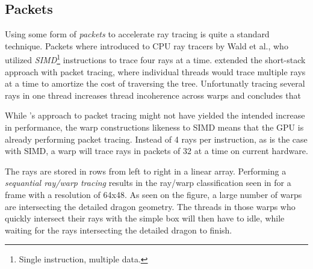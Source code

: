 \subsection{Packets}


Using some form of \textit{packets} to accelerate ray tracing is quite
a standard technique. Packets where introduced to CPU ray tracers by
Wald et al., who utilized
\textit{SIMD}\footnote{Single instruction, multiple data.}
instructions to trace four rays at a time. \horn{} extended the
short-stack approach with packet tracing, where individual threads
would trace multiple rays at a time to amortize the cost of traversing
the tree. Unfortunatly tracing several rays in one thread increases
thread incoherence across warps and \aila{} concludes that




While \horn's approach to packet tracing might not have yielded the intended
increase in performance, the warp constructions likeness to SIMD means that the
GPU is already performing packet tracing. Instead of 4 rays per instruction, as
is the case with SIMD, a warp will trace rays in packets of 32 at a time on
current hardware.

The rays are stored in rows from left to right in a linear array. Performing a
\textit{sequantial ray/warp tracing} results in the ray/warp classification seen
in  for a frame with a resolution of 64x48. As
seen on the figure, a large number of warps are intersecting the detailed dragon
geometry. The threads in those warps who quickly intersect their rays with the
simple box will then have to idle, while waiting for the rays intersecting the
detailed dragon to finish.

